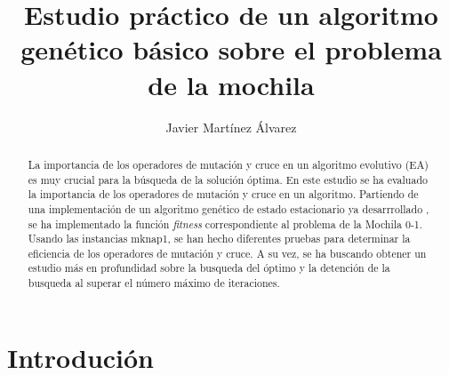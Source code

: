 \documentclass[runningheads]{llncs}
\begin{document}
%
\title{Estudio práctico de un algoritmo genético básico sobre el problema de la mochila}
%
%
\author{Javier Martínez Álvarez}
%
%
%
\maketitle              %
%
\begin{abstract}
	La importancia de los operadores de mutación y cruce en un algoritmo evolutivo (EA)
	es muy crucial para la búsqueda de la solución óptima. En este estudio se ha
	evaluado la importancia de los operadores de mutación y cruce en un algoritmo. Partiendo de
	una implementación de un algoritmo genético de estado estacionario ya desarrrollado \cite{ref_ssga},
	se ha implementado la función \textit{fitness} correspondiente al problema de la Mochila 0-1.
	Usando las instancias mknap1, se han hecho diferentes pruebas para determinar la eficiencia de los
	operadores de mutación y cruce. A su vez, se ha buscando obtener un estudio más en profundidad sobre
	la busqueda del óptimo y la detención de la busqueda al superar el número máximo de iteraciones.

\end{abstract}
%
%
%
\section{Introdución}
\end{document}
